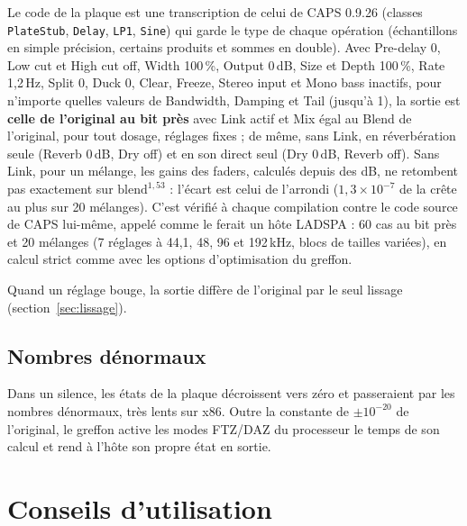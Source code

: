 \documentclass[a4paper,11pt]{article}
\newcommand{\dB}{\,dB}
\begin{document}
Le code de la plaque est une transcription de celui de CAPS 0.9.26 (classes \texttt{PlateStub},
\texttt{Delay}, \texttt{LP1}, \texttt{Sine}) qui garde le type de chaque opération (échantillons
en simple précision, certains produits et sommes en double). Avec Pre-delay 0, Low cut et High
cut off,
Width 100\,\%, Output 0\dB, Size et Depth 100\,\%, Rate 1,2\,Hz, Split 0, Duck 0, Clear, Freeze, Stereo input et Mono bass
inactifs, pour n'importe
quelles valeurs de Bandwidth, Damping et Tail (jusqu'à 1), la sortie est \textbf{celle de l'original au bit
près} avec Link actif et Mix égal au Blend de l'original, pour tout dosage, réglages fixes ; de
même, sans Link, en réverbération seule (Reverb 0\dB, Dry off) et en son direct seul (Dry
0\dB, Reverb off). Sans Link, pour un mélange, les gains des faders, calculés depuis des dB, ne
retombent pas exactement sur $\mathrm{blend}^{1{,}53}$ : l'écart est celui de l'arrondi
($1{,}3\times10^{-7}$ de la crête au plus sur 20 mélanges). C'est vérifié à chaque compilation
contre le code source de CAPS lui-même, appelé comme le ferait un hôte LADSPA : 60 cas au bit
près et 20 mélanges (7 réglages à 44,1, 48, 96 et 192\,kHz, blocs de
tailles variées), en calcul strict comme avec les options d'optimisation du greffon.

Quand un réglage bouge, la sortie diffère de l'original par le seul lissage
(section~\ref{sec:lissage}).

\subsection{Nombres dénormaux}

Dans un silence, les états de la plaque décroissent vers zéro et passeraient par les nombres
dénormaux, très lents sur x86. Outre la constante de $\pm 10^{-20}$ de l'original, le greffon
active les modes FTZ/DAZ du processeur le temps de son calcul et rend à l'hôte son propre état
en sortie.

\section{Conseils d'utilisation}
\end{document}
